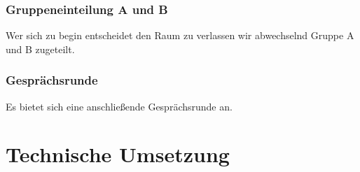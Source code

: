 \documentclass[a4paper, 12pt]{report}
\begin{document}
\subsection*{Gruppeneinteilung A und B}
Wer sich zu begin entscheidet den Raum zu verlassen wir abwechselnd Gruppe A und B zugeteilt.

\subsection*{Gesprächsrunde}
Es bietet sich eine anschließende Gesprächsrunde an.

\chapter*{Technische Umsetzung}\label{technische_umsetzung}

   
\printbibliography

\listoftodos
 
\end{document}
